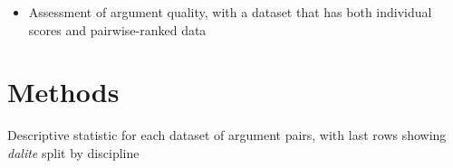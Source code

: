 \documentclass[runningheads]{llncs}
\begin{document}
\begin{itemize}

	\item \cite{toledo_automatic_2019} Assessment of argument quality, with a 
	dataset that has both individual scores 
	and pairwise-ranked data 
	
\end{itemize}
  




\section{Methods}

%
%

\begin{table}
	\caption{Descriptive statistic for each dataset of argument pairs, with 
	last rows showing \textit{dalite} split by discipline}
	
\end{table}
\end{document}
